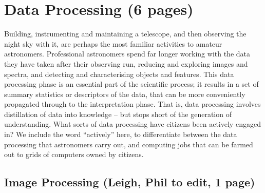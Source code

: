 \documentclass{ar2e}
\begin{document}

\section{Data Processing (6 pages)}
\label{sec:class}

Building, instrumenting and maintaining a telescope, and then observing the
night sky with it, are perhaps the most familiar activities to amateur
astronomers. Professional astronomers spend far longer working with the data
they have taken after their observing run, reducing and exploring images and
spectra, and detecting and characterising objects and features. This data
processing phase is an essential part of the scientific process; it results in a
set of summary statistics or descriptors of the data, that can be more
conveniently propagated through to the interpretation phase. That is, data
processing involves distillation of data into knowledge -- but stops short of
the generation of understanding. What sorts of data processing have citizens
been actively engaged in? We include the word ``actively'' here, to
differentiate between the data processing that astronomers carry out, and 
computing jobs that can be farmed out to grids of computers owned by citizens. 



\subsection{Image Processing (\textbf{Leigh}, Phil to edit, 1 page)}
\label{sec:class:non-sensory}
\end{document}
